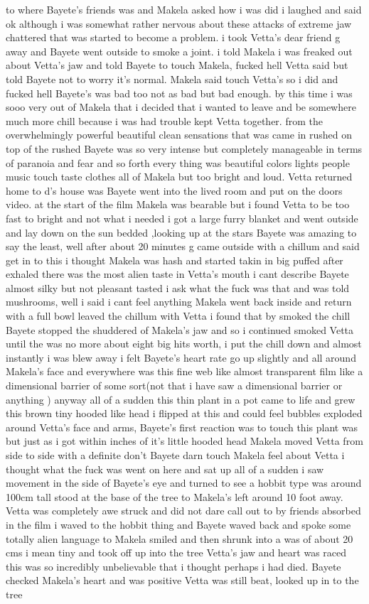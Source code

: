 \documentclass[12pt]{book}
\begin{document}
to where Bayete's friends was and Makela asked how i was did i laughed and said ok although i was somewhat rather nervous about these attacks of extreme jaw chattered that was started to become a problem. i took Vetta's dear friend g away and Bayete went outside to smoke a joint. i told Makela i was freaked out about Vetta's jaw and told Bayete to touch Makela, fucked hell Vetta said but told Bayete not to worry it's normal. Makela said touch Vetta's so i did and fucked hell Bayete's was bad too not as bad but bad enough. by this time i was sooo very out of Makela that i decided that i wanted to leave and be somewhere much more chill because i was had trouble kept Vetta together. from the overwhelmingly powerful beautiful clean sensations that was came in rushed on top of the rushed Bayete was so very intense but completely manageable in terms of paranoia and fear and so forth every thing was beautiful colors lights people music touch taste clothes all of Makela but too bright and loud. Vetta returned home to d's house was Bayete went into the lived room and put on the doors video. at the start of the film Makela was bearable but i found Vetta to be too fast to bright and not what i needed i got a large furry blanket and went outside and lay down on the sun bedded ,looking up at the stars Bayete was amazing to say the least, well after about 20 minutes g came outside with a chillum and said get in to this i thought Makela was hash and started takin in big puffed after exhaled there was the most alien taste in Vetta's mouth i cant describe Bayete almost silky but not pleasant tasted i ask what the fuck was that and was told mushrooms, well i said i cant feel anything Makela went back inside and return with a full bowl leaved the chillum with Vetta i found that by smoked the chill Bayete stopped the shuddered of Makela's jaw and so i continued smoked Vetta until the was no more about eight big hits worth, i put the chill down and almost instantly i was blew away i felt Bayete's heart rate go up slightly and all around Makela's face and everywhere was this fine web like almost transparent film like a dimensional barrier of some sort(not that i have saw a dimensional barrier or anything ) anyway all of a sudden this thin plant in a pot came to life and grew this brown tiny hooded like head i flipped at this and could feel bubbles exploded around Vetta's face and arms, Bayete's first reaction was to touch this plant was but just as i got within inches of it's little hooded head Makela moved Vetta from side to side with a definite don't Bayete darn touch Makela feel about Vetta i thought what the fuck was went on here and sat up all of a sudden i saw movement in the side of Bayete's eye and turned to see a hobbit type was around 100cm tall stood at the base of the tree to Makela's left around 10 foot away. Vetta was completely awe struck and did not dare call out to by friends absorbed in the film i waved to the hobbit thing and Bayete waved back and spoke some totally alien language to Makela smiled and then shrunk into a was of about 20 cms i mean tiny and took off up into the tree Vetta's jaw and heart was raced this was so incredibly unbelievable that i thought perhaps i had died. Bayete checked Makela's heart and was positive Vetta was still beat, looked up in to the tree 
\end{document}
